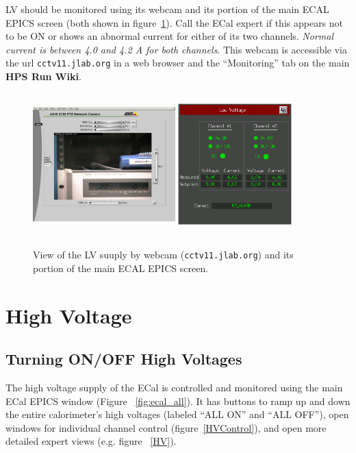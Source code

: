 \documentclass[12pt]{article}
\begin{document}
LV should be monitored using its webcam and its portion of the main ECAL EPICS screen (both shown in figure~\ref{LVCam}). Call the ECal expert if this appears not to be ON or shows an abnormal current for either of its two channels.  {\em Normal current is between 4.0 and 4.2 A for both channels}.  This webcam is accessible via the url \texttt{cctv11.jlab.org} in a web browser and the ``Monitoring'' tab on the main {\bf HPS Run Wiki}.
\begin{figure}[htbp]
\center
\includegraphics[width=0.49\textwidth,height=5.5cm]{pics/LVCam_2014_12_20.png}
\includegraphics[width=0.39\textwidth,height=5.5cm]{pics/lvnovice.png}
\caption{ \label{LVCam} View of the LV suuply by webcam (\texttt{cctv11.jlab.org}) and its portion of the main ECAL EPICS screen.}
\end{figure}

\section{High Voltage}
      \subsection{Turning ON/OFF High Voltages}

      The high voltage supply of the ECal is controlled and monitored using the main ECal EPICS window (Figure ~\ref{fig:ecal_all}).  It has buttons to ramp up and down the entire calorimeter's high voltages (labeled ``ALL ON'' and ``ALL OFF''), open windows for individual channel control (figure~\ref{HVControl}), and open more detailed expert views (e.g. figure ~\ref{HV}).
\end{document}
